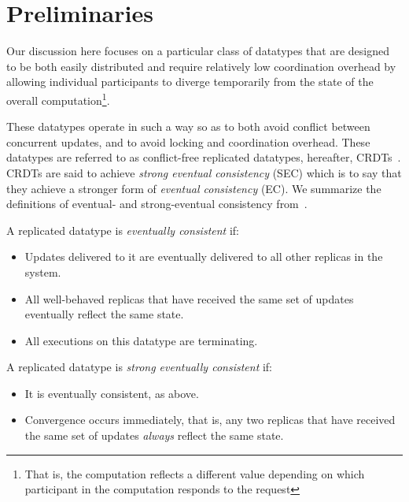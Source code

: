 \section{Preliminaries}

Our discussion here focuses on a particular class of datatypes that are designed
to be both easily distributed and require relatively low coordination overhead
by allowing individual participants to diverge temporarily from the state of the
overall computation\footnote{That is, the computation reflects a different
value depending on which participant in the computation responds to the
request}.

These datatypes operate in such a way so as to both avoid conflict between
concurrent updates, and to avoid locking and coordination overhead. These
datatypes are referred to as conflict-free replicated datatypes, hereafter,
CRDTs~\citep{shapiro11}. CRDTs are said to achieve \textit{strong eventual
consistency} (SEC) which is to say that they achieve a stronger form of
\textit{eventual consistency} (EC). We summarize the definitions of eventual-
and strong-eventual consistency from~\cite{shapiro11}.

\begin{definition}
  A replicated datatype is \textit{eventually consistent} if:
  \begin{itemize}
    \item Updates delivered to it are eventually delivered to all other replicas
      in the system.
    \item All well-behaved replicas that have received the same set of updates
      eventually reflect the same state.
    \item All executions on this datatype are terminating.
  \end{itemize}
\end{definition}

\begin{definition}
  A replicated datatype is \textit{strong eventually consistent} if:
  \begin{itemize}
    \item It is eventually consistent, as above.
    \item Convergence occurs immediately, that is, any two replicas that have
      received the same set of updates \textit{always} reflect the same state.
  \end{itemize}
\end{definition}

